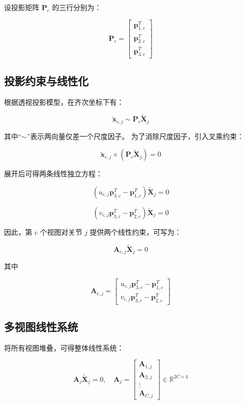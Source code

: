 设投影矩阵 $\mathbf{P}_c$ 的三行分别为：

\[
\mathbf{P}_c =
\begin{bmatrix}
\mathbf{p}_{1,c}^T \\
\mathbf{p}_{2,c}^T \\
\mathbf{p}_{3,c}^T
\end{bmatrix}
\]

\subsection{投影约束与线性化}

根据透视投影模型，在齐次坐标下有：

\[
\tilde{\mathbf{x}}_{c,j} \sim \mathbf{P}_c \tilde{\mathbf{X}}_j
\]

其中“$\sim$”表示两向量仅差一个尺度因子。
为了消除尺度因子，引入叉乘约束：

\[
\tilde{\mathbf{x}}_{c,j} \times (\mathbf{P}_c \tilde{\mathbf{X}}_j) = 0
\]

展开后可得两条线性独立方程：

\[
(u_{c,j} \mathbf{p}_{3,c}^T - \mathbf{p}_{1,c}^T)\tilde{\mathbf{X}}_j = 0
\]

\[
(v_{c,j} \mathbf{p}_{3,c}^T - \mathbf{p}_{2,c}^T)\tilde{\mathbf{X}}_j = 0
\]

因此，第 $c$ 个视图对关节 $j$ 提供两个线性约束，可写为：

\[
\mathbf{A}_{c,j}\tilde{\mathbf{X}}_j = 0
\]

其中

\[
\mathbf{A}_{c,j} =
\begin{bmatrix}
u_{c,j} \mathbf{p}_{3,c}^T - \mathbf{p}_{1,c}^T \\
v_{c,j} \mathbf{p}_{3,c}^T - \mathbf{p}_{2,c}^T
\end{bmatrix}
\]

\subsection{多视图线性系统}

将所有视图堆叠，可得整体线性系统：

\[
\mathbf{A}_j \tilde{\mathbf{X}}_j = 0,
\quad
\mathbf{A}_j =
\begin{bmatrix}
\mathbf{A}_{1,j} \\
\mathbf{A}_{2,j} \\
\vdots \\
\mathbf{A}_{C,j}
\end{bmatrix}
\in \mathbb{R}^{2C \times 4}
\]

